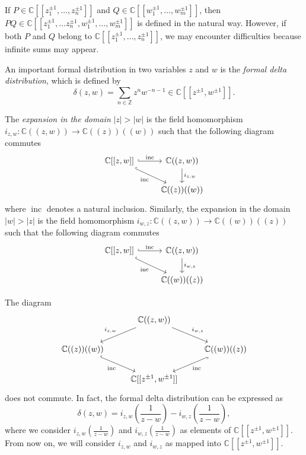 \documentclass[a4paper, 12pt, reqno]{amsart}
\theoremstyle{remark}
\DeclareMathOperator{\inc}{inc}
\begin{document}
If $P \in \mathbb{C}[[z_1^{\pm 1}, \dots, z_n^{\pm 1}]]$ and $Q \in \mathbb{C}[[w_1^{\pm 1}, \dots, w_m^{\pm 1}]]$, then $PQ \in \mathbb{C}[[z_1^{\pm 1}, \dots z_n^{\pm 1}, w_1^{\pm 1}, \dots, w_m^{\pm 1}]]$ is defined in the natural way.
However, if both $P$ and $Q$ belong to $\mathbb{C}[[z_1^{\pm 1}, \dots, z_n^{\pm 1}]]$, we may encounter difficulties because infinite sums may appear.

An important formal distribution in two variables $z$ and $w$ is the \emph{formal delta distribution}, which is defined by
\begin{equation*}
  \delta(z, w) = \sum_{n \in \mathbb{Z}}z^nw^{-n - 1} \in \mathbb{C}[[z^{\pm 1}, w^{\pm 1}]].
\end{equation*}

The \emph{expansion in the domain} $|z| > |w|$ is the field homomorphism $i_{z, w}: \mathbb{C}((z, w)) \to \mathbb{C}((z))((w))$ such that the following diagram commutes
\begin{equation*}
  \begin{tikzcd}
    {\mathbb{C}[[z, w]]} \arrow[rd, "\inc"', hook] \arrow[r, "\inc", hook] & {\mathbb{C}((z, w))} \arrow[d, "{i_{z, w}}"] \\
    & \mathbb{C}((z))((w))
  \end{tikzcd}
\end{equation*}
where $\inc$ denotes a natural inclusion.
Similarly, the expansion in the domain $|w| > |z|$ is the field homomorphism $i_{w, z}: \mathbb{C}((z, w)) \to \mathbb{C}((w))((z))$ such that the following diagram commutes
\begin{equation*}
  \begin{tikzcd}
    {\mathbb{C}[[z, w]]} \arrow[rd, "\inc"', hook] \arrow[r, "\inc", hook] & {\mathbb{C}((z, w))} \arrow[d, "{i_{w, z}}"] \\
    & \mathbb{C}((w))((z))
  \end{tikzcd}
\end{equation*}

The diagram
\begin{equation*}
  \begin{tikzcd}
    & {\mathbb{C}((z, w))} \arrow[ld, "{i_{z, w}}"'] \arrow[rd, "{i_{w, z}}"] &\\
    \mathbb{C}((z))((w)) \arrow[rd, "\inc"', hook] && \mathbb{C}((w))((z)) \arrow[ld, "\inc", hook] \\
    & {\mathbb{C}[[z^{\pm 1}, w^{\pm 1}]]} &
  \end{tikzcd}
\end{equation*}
does not commute.
In fact, the formal delta distribution can be expressed as
\begin{equation*}
  \delta(z, w) = i_{z, w}\left(\frac{1}{z - w}\right) - i_{w, z}\left(\frac{1}{z - w}\right),
\end{equation*}
where we consider $i_{z, w}(\frac{1}{z - w})$ and $i_{w, z}(\frac{1}{z - w})$ as elements of $\mathbb{C}[[z^{\pm 1}, w^{\pm 1}]]$.
From now on, we will consider $i_{z, w}$ and $i_{w, z}$ as mapped into $\mathbb{C}[[z^{\pm 1}, w^{\pm 1}]]$.
\end{document}
